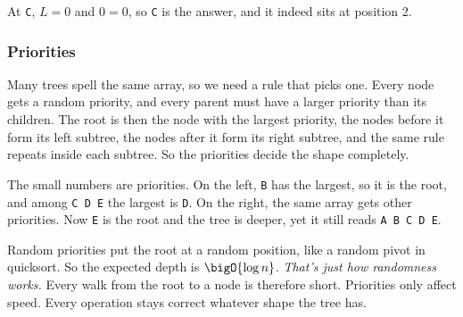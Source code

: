At \texttt{C}, \(L = 0\) and \(0 = 0\), so \texttt{C} is the answer, and it indeed sits at position 2.

\subsubsection{Priorities}
Many trees spell the same array, so we need a rule that picks one. Every node gets a random priority, and every parent must have a larger priority than its children. The root is then the node with the largest priority, the nodes before it form its left subtree, the nodes after it form its right subtree, and the same rule repeats inside each subtree. So the priorities decide the shape completely.

\begin{center}
\end{center}
The small numbers are priorities. On the left, \texttt{B} has the largest, so it is the root, and among \texttt{C D E} the largest is \texttt{D}. On the right, the same array gets other priorities. Now \texttt{E} is the root and the tree is deeper, yet it still reads \texttt{A B C D E}.

Random priorities put the root at a random position, like a random pivot in quicksort. So the expected depth is \(\bigO{\log n}\). \textit{That's just how randomness works.} Every walk from the root to a node is therefore short. Priorities only affect speed. Every operation stays correct whatever shape the tree has.

